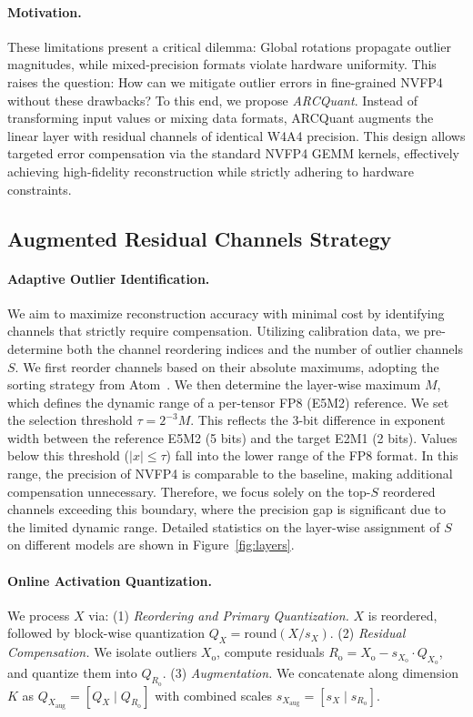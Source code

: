 \documentclass[11pt]{article}
\begin{document}
\paragraph{Motivation.}
These limitations present a critical dilemma: Global rotations propagate outlier magnitudes, while mixed-precision formats violate hardware uniformity. This raises the question: How can we mitigate outlier errors in fine-grained NVFP4 without these drawbacks? To this end, we propose \textit{ARCQuant}. Instead of transforming input values or mixing data formats, ARCQuant augments the linear layer with residual channels of identical W4A4 precision. This design allows targeted error compensation via the standard NVFP4 GEMM kernels, effectively achieving high-fidelity reconstruction while strictly adhering to hardware constraints.



\subsection{Augmented Residual Channels Strategy}

\paragraph{Adaptive Outlier Identification.} We aim to maximize reconstruction accuracy with minimal cost by identifying channels that strictly require compensation. Utilizing calibration data, we pre-determine both the channel reordering indices and the number of outlier channels $S$. We first reorder channels based on their absolute maximums, adopting the sorting strategy from Atom~\citep{atom}. We then determine the layer-wise maximum $M$, which defines the dynamic range of a per-tensor FP8 (E5M2) reference. We set the selection threshold $\tau = 2^{-3} M$. This reflects the 3-bit difference in exponent width between the reference E5M2 (5 bits) and the target E2M1 (2 bits). Values below this threshold ($|x| \le \tau$) fall into the lower range of the FP8 format. In this range, the precision of NVFP4 is comparable to the baseline, making additional compensation unnecessary. Therefore, we focus solely on the top-$S$ reordered channels exceeding this boundary, where the precision gap is significant due to the limited dynamic range. Detailed statistics on the layer-wise assignment of $S$ on different models are shown in Figure~\ref{fig:layers}.

\paragraph{Online Activation Quantization.} We process $X$ via: (1) \textit{Reordering and Primary Quantization.} $X$ is reordered, followed by block-wise quantization $Q_X = \text{round}(X / s_X)$. (2) \textit{Residual Compensation.} We isolate outliers $X_{\text{o}}$, compute residuals $R_{\text{o}} = X_{\text{o}} - s_{X_{\text{o}}} \cdot Q_{X_{\text{o}}}$, and quantize them into $Q_{R_{\text{o}}}$. (3) \textit{Augmentation.} We concatenate along dimension $K$ as $Q_{X_{\text{aug}}} = [Q_X \mid Q_{R_{\text{o}}}]$ with combined scales $s_{X_{\text{aug}}} = [s_X \mid s_{R_{\text{o}}}]$.
\end{document}
